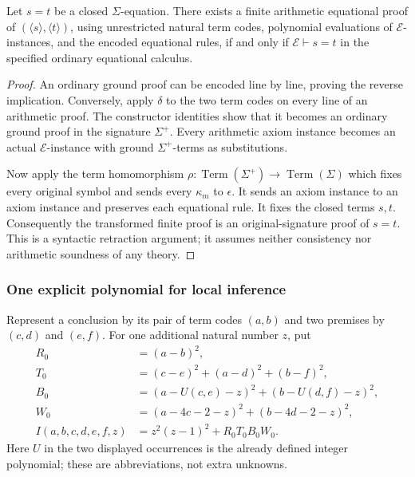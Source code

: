 \documentclass[11pt,a4paper]{article}
\theoremstyle{definition}
\begin{document}
\begin{auxsyntaxthm}
\label{thm:syntax-retraction}
Let $s=t$ be a closed $\Sigma$-equation.  There exists a finite arithmetic
equational proof of
$(\langle s\rangle,\langle t\rangle)$, using unrestricted natural term
codes, polynomial evaluations of $\mathcal E$-instances, and the encoded
equational rules, if and only if $\mathcal E\vdash s=t$ in the specified
ordinary equational calculus.
\end{auxsyntaxthm}
\begin{proof}
An ordinary ground proof can be encoded line by line, proving the
reverse implication.  Conversely, apply $\delta$ to the two term codes
on every line of an arithmetic proof.  The constructor identities show
that it becomes an ordinary ground proof in the signature $\Sigma^+$.
Every arithmetic axiom instance becomes an actual $\mathcal E$-instance
with ground $\Sigma^+$-terms as substitutions.

Now apply the term homomorphism
$\rho:\operatorname{Term}(\Sigma^+)\to\operatorname{Term}(\Sigma)$
which fixes every original symbol and sends every $\kappa_m$ to
$\epsilon$.  It sends an axiom instance to an axiom instance and
preserves each equational rule.  It fixes the closed terms $s,t$.
Consequently the transformed finite proof is an original-signature
proof of $s=t$.  This is a syntactic retraction argument; it assumes
neither consistency nor arithmetic soundness of any theory.
\end{proof}

\subsubsection*{One explicit polynomial for local inference}

Represent a conclusion by its pair of term codes $(a,b)$ and two premises
by $(c,d)$ and $(e,f)$.  For one additional natural number $z$, put
\begin{align}
 R_0&=(a-b)^2,\\
 T_0&=(c-e)^2+(a-d)^2+(b-f)^2,\\
 B_0&=(a-U(c,e)-z)^2+(b-U(d,f)-z)^2,\\
 W_0&=(a-4c-2-z)^2+(b-4d-2-z)^2,\\
 I(a,b,c,d,e,f,z)&=z^2(z-1)^2+R_0T_0B_0W_0.
 \label{eq:local-inference-poly}
\end{align}
Here $U$ in the two displayed occurrences is the already defined
integer polynomial; these are abbreviations, not extra unknowns.
\end{document}
